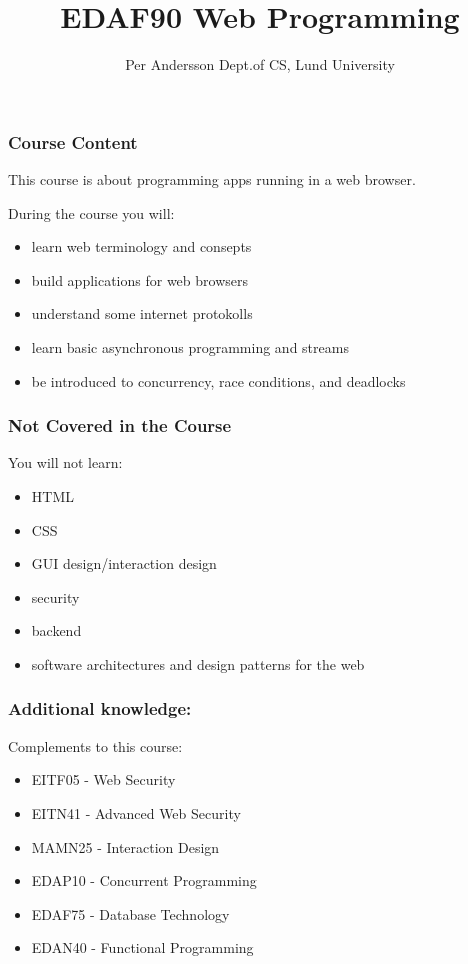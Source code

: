\documentclass[aspectratio=1610]{beamer}
\title[EDAF90 Web Programming]{EDAF90 Web Programming}
\author[Per Andersson]{%
  Per Andersson\newline
  Dept.\@ of CS, Lund University}
\begin{document}
\begin{frame}[plain]%
  \titlepage
\end{frame}

\begin{frame}
  \frametitle{Course Content}

This course is about programming apps running in a web browser.

\vspace{5mm}

During the course you will:
\begin{itemize}
\item learn web terminology and consepts
\item build applications for web browsers
\item understand some internet protokolls
\item learn basic asynchronous programming and streams
\item be introduced to concurrency, race conditions, and deadlocks
\end{itemize}

\end{frame}


\begin{frame}
  \frametitle{Not Covered in the Course}
You will not learn:
\begin{itemize}
\item HTML
\item CSS
\item GUI design/interaction design
\item security
\item backend
\item software architectures and design patterns for the web
\end{itemize}

\end{frame}

\begin{frame}
  \frametitle{Additional knowledge:}
Complements to this course:
\begin{itemize}
\item EITF05 - Web Security
\item EITN41 - Advanced Web Security
\item MAMN25 - Interaction Design
\item EDAP10  - Concurrent Programming
\item EDAF75 - Database Technology
\item EDAN40 - Functional Programming
\end{itemize}

\end{frame}
\end{document}
